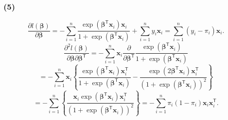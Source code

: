 \documentclass[pdflatex,ja=standard]{bxjsarticle}
\begin{document}
\subsubsection*{(5)}
\begin{equation}
    \frac{\partial l(\bm{\beta})}{\partial \bm{\beta}} = - \sum_{i=1}^{n} \frac{ \exp(\bm{\beta}^{\mathsf{T}} \bm{x}_i ) \bm{x}_i}{ 1 +  \exp (\bm{\beta}^{\mathsf{T}} \bm{x}_i )} + \sum_{i=1}^{n} y_i \bm{x}_i = \sum_{i=1}^{n} ( y_i - \pi_i ) \bm{x}_i.
\end{equation}
\begin{equation}
    \frac{\partial^2 l(\bm{\beta})}{\partial \bm{\beta} \partial \bm{\beta}^{\mathsf{T}}} = - \sum_{i=1}^{n} \bm{x}_i \frac{\partial}{\partial \bm{\beta}^{\mathsf{T}}} \frac{ \exp(\bm{\beta}^{\mathsf{T}} \bm{x}_i ) }{ 1 +  \exp (\bm{\beta}^{\mathsf{T}} \bm{x}_i )} 
\end{equation}
\begin{equation}
    = - \sum_{i=1}^{n} \bm{x}_i \left\{ \frac{ \exp(\bm{\beta}^{\mathsf{T}} \bm{x}_i ) \bm{x}_i^{\mathsf{T}} }{ 1 +  \exp (\bm{\beta}^{\mathsf{T}} \bm{x}_i )} -  \frac{ \exp(2\bm{\beta}^{\mathsf{T}} \bm{x}_i ) \bm{x}_i^{\mathsf{T}} }{ (1 +  \exp (\bm{\beta}^{\mathsf{T}} \bm{x}_i ))^2} \right\}
\end{equation}
\begin{equation}
    = - \sum_{i=1}^{n} \left\{ \frac{ \bm{x}_i  \exp(\bm{\beta}^{\mathsf{T}} \bm{x}_i ) \bm{x}_i^{\mathsf{T}} }{ (1 +  \exp (\bm{\beta}^{\mathsf{T}} \bm{x}_i ))^2} \right\}
    = - \sum_{i=1}^{n} \pi_i (1 - \pi_i) \bm{x}_{i} \bm{x}_{i}^{\mathsf{T}}.
\end{equation}
\end{document}
